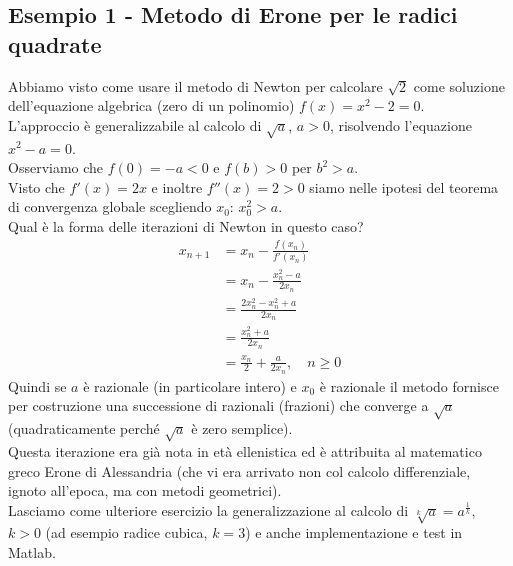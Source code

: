 \documentclass[12pt]{article}
\begin{document}
\subsection{Esempio 1 - Metodo di Erone per le radici quadrate}
Abbiamo visto come usare il metodo di Newton per calcolare $\sqrt{2}$ come soluzione dell'equazione algebrica (zero di un polinomio) $f(x) = x^2 - 2 = 0$.\\
L'approccio è generalizzabile al calcolo di $\sqrt{a}$, $a>0$, risolvendo l'equazione $x^2 - a = 0$.\\
Osserviamo che $f(0) = - a < 0$ e $f(b) > 0$ per $b^2 > a$.\\
Visto che $f'(x) = 2x$ e inoltre $f''(x) = 2 > 0$ siamo nelle ipotesi del teorema di convergenza globale scegliendo $x_0$: $x^2_0 > a$.\\
Qual è la forma delle iterazioni di Newton in questo caso?
\[\begin{split}
    x_{n+1} & = x_n - \frac{f(x_n)}{f'(x_n)} \\
    & = x_n - \frac{x_n^2-a}{2 x_n} \\
    & = \frac{2 x_n^2 - x_n^2 + a}{2 x_n} \\
    & = \frac{x_n^2 + a}{2 x_n} \\
    & = \frac{x_n}{2} + \frac{a}{2 x_n}, \quad n \ge 0
\end{split}\]
Quindi se $a$ è razionale (in particolare intero) e $x_0$ è razionale il metodo fornisce per costruzione una successione di razionali (frazioni) che converge a $\sqrt{a}$ (quadraticamente perché $\sqrt{a}$ è zero semplice).\\
Questa iterazione era già nota in età ellenistica ed è attribuita al matematico greco Erone di Alessandria (che vi era arrivato non col calcolo differenziale, ignoto all'epoca, ma con metodi geometrici).\\
Lasciamo come ulteriore esercizio la generalizzazione al calcolo di $\sqrt[k]{a} = a^{\frac{1}{k}}$, $k>0$ (ad esempio radice cubica, $k=3$) e anche implementazione e test in Matlab.
\end{document}
